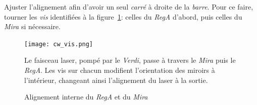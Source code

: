 \begin{enumerate}
   Ajuster l'alignement afin d'avoir un seul \textit{carré} à droite de la \textit{barre}. Pour ce faire, tourner les \textit{vis} identifiées à la figure~\ref{fig:cw_vis}: celles du \textit{RegA} d'abord, puis celles du \textit{Mira} si nécessaire.
        \begin{figure}[H]
        \begin{center} \texttt{[image: cw\_vis.png]} \end{center}
        \caption{Alignement interne du \textit{RegA} et du \textit{Mira}}
        \begin{footnotesize} Le faisceau laser, pompé par le \textit{Verdi}, passe à travers le \textit{Mira} puis le \textit{RegA}. Les vis sur chacun modifient l'orientation des miroirs à l'intérieur, changeant ainsi l'alignement du laser à la sortie. \end{footnotesize}
        \label{fig:cw_vis}
        \end{figure}
\end{enumerate}